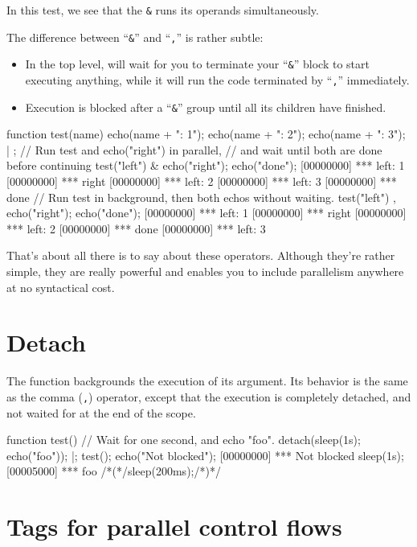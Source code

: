 In this test, we see that the \lstinline{&} runs its operands
simultaneously.

The difference between ``\lstinline{&}'' and ``\lstinline{,}'' is
rather subtle:

\begin{itemize}
\item In the top level, will wait for you to terminate your
  ``\lstinline{&}'' block to start executing anything, while it will
  run the code terminated by ``\lstinline{,}'' immediately.
\item Execution is blocked after a ``\lstinline{&}'' group until all
  its children have finished.
\end{itemize}

\begin{urbiscript}[firstnumber=1]
function test(name)
{
  echo(name + ": 1");
  echo(name + ": 2");
  echo(name + ": 3");
} | {};
// Run test and echo("right") in parallel,
// and wait until both are done before continuing
test("left") & echo("right"); echo("done");
[00000000] *** left: 1
[00000000] *** right
[00000000] *** left: 2
[00000000] *** left: 3
[00000000] *** done
// Run test in background, then both echos without waiting.
test("left") , echo("right"); echo("done");
[00000000] *** left: 1
[00000000] *** right
[00000000] *** left: 2
[00000000] *** done
[00000000] *** left: 3
\end{urbiscript}

That's about all there is to say about these operators. Although
they're rather simple, they are really powerful and enables you to
include parallelism anywhere at no syntactical cost.

\section{Detach}

The  function backgrounds the execution of
its argument. Its behavior is the same as the comma (\lstinline{,})
operator, except that the execution is completely detached, and not
waited for at the end of the scope.

\begin{urbiscript}[firstnumber=1]
function test()
{
  // Wait for one second, and echo "foo".
  detach({sleep(1s); echo("foo")});
}|;
test();
echo("Not blocked");
[00000000] *** Not blocked
sleep(1s);
[00005000] *** foo
/*(*/sleep(200ms);/*)*/
\end{urbiscript}

\section{Tags for parallel control flows}
\label{sec:tut:tags}

